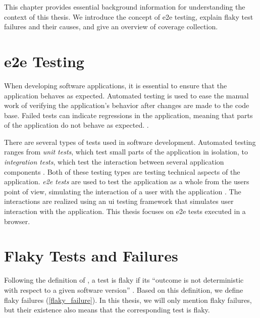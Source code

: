 This chapter provides essential background information for understanding the context of this thesis.
We introduce the concept of \ac{e2e} testing, explain flaky test failures and their causes, and give an overview of coverage collection.

\section{\acf*{e2e} Testing}

When developing software applications, it is essential to ensure that the application behaves as expected.
Automated testing is used to ease the manual work of verifying the application's behavior after changes are made to the code base.
Failed tests can indicate regressions in the application, meaning that parts of the application do not behave as expected. \autocite{lam_large-scale_2020, luo_empirical_2014,romano_empirical_2021}.

There are several types of tests used in software development.
Automated testing ranges from \emph{unit tests}, which test small parts of the application in isolation, to \emph{integration tests}, which test the interaction between several application components \autocite{huizinga_automated_2007}.
Both of these testing types are testing technical aspects of the application.
\emph{\ac{e2e} tests} are used to test the application as a whole from the users point of view, simulating the interaction of a user with the application \autocite{jacob_schmitt_what_2022}.
The interactions are realized using an \ac{ui} testing framework that simulates user interaction with the application.
This thesis focuses on \ac{e2e} tests executed in a browser.


\section{Flaky Tests and Failures}

Following the definition of \citeauthor*{luo_empirical_2014} \autocite{luo_empirical_2014}, a test is flaky if its \enquote{outcome is not deterministic with respect to a given software version} \autocite{luo_empirical_2014}.
Based on this definition, we define flaky failures (\cref{flaky_failure}).
In this thesis, we will only mention flaky failures, but their existence also means that the corresponding test is flaky.

